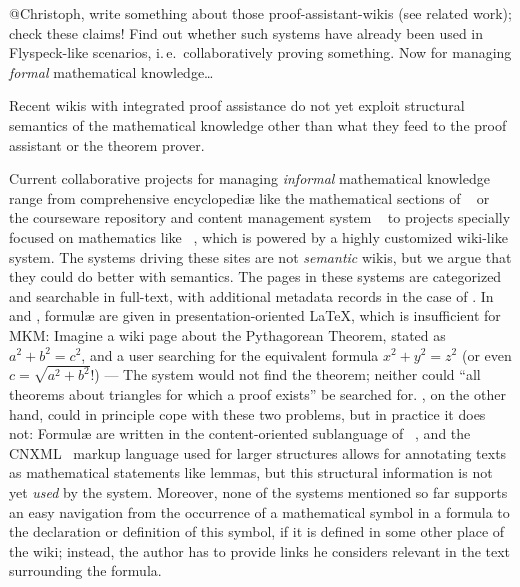 \documentclass{llncs}
\begin{document}
\begin{todo}{@Christoph, write something about those proof-assistant-wikis (see related
    work); check these claims!  Find out whether such systems have already been used in
    Flyspeck-like scenarios, i.\,e.\ collaboratively proving something.}
  Now for managing \emph{formal} mathematical knowledge\ldots

  Recent wikis with integrated proof assistance do not yet exploit structural semantics of
  the mathematical knowledge other than what they feed to the proof assistant or the
  theorem prover.
\end{todo}

Current collaborative projects for managing \emph{informal} mathematical knowledge range
from comprehensive encyclopediæ like the mathematical sections of
~\cite{wikipedia} or the courseware repository and content management
system ~\cite{CNX:whitepaper} to projects specially focused on
mathematics like ~\cite{krowne03:collaborative-math-libraries}, which
is powered by a highly customized wiki-like system.  The systems driving these sites are
not \emph{semantic} wikis, but we argue that they could do better with semantics.  The
pages in these systems are categorized and searchable in full-text, with additional
metadata records in the case of .  In  and
, formulæ are given in presentation-oriented {\LaTeX}, which is
insufficient for MKM: Imagine a wiki page about the Pythagorean Theorem, stated as $a^2 +
b^2 = c^2$, and a user searching for the equivalent formula $x^2 + y^2 = z^2$ (or even
$c=\sqrt{a^2+b^2}$!) --- The system would not find the theorem; neither could ``all
theorems about triangles for which a proof exists'' be searched for.
, on the other hand, could in principle cope with these two problems,
but in practice it does not: Formulæ are written in the content-oriented sublanguage of
{\mathml}~\cite{CarlisleEd:MathML07}, and the CNXML~\cite{connexions05:cnxml} markup
language used for larger structures allows for annotating texts as mathematical statements
like lemmas, but this structural information is not yet \emph{used} by the system.
Moreover, none of the systems mentioned so far supports an easy navigation from the
occurrence of a mathematical symbol in a formula to the declaration or definition of this
symbol, if it is defined in some other place of the wiki; instead, the author has to
provide links he considers relevant in the text surrounding the formula.
\end{document}
